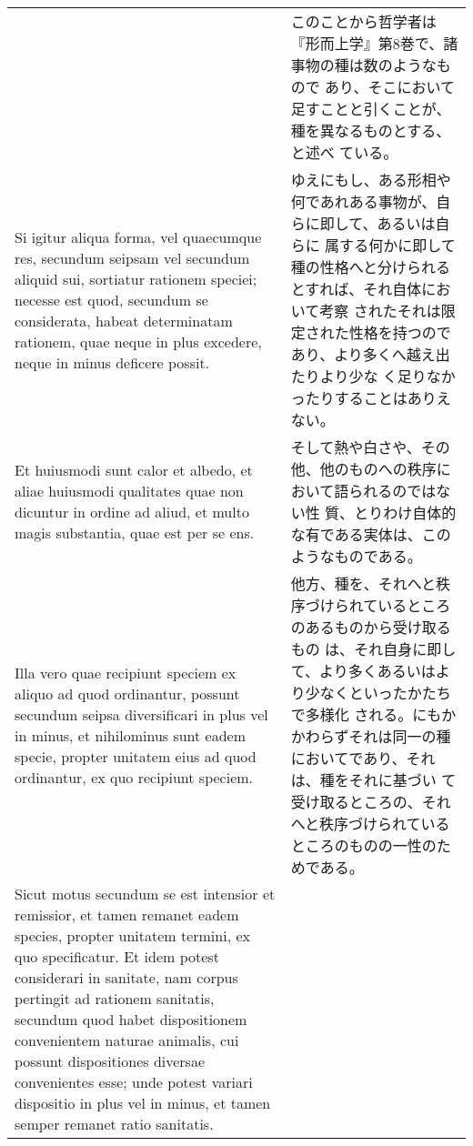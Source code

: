 \documentclass[10pt]{jsarticle} %
\begin{document}
\begin{longtable}{p{21em}p{21em}}
&

このことから哲学者は『形而上学』第8巻で、諸事物の種は数のようなもので
 あり、そこにおいて足すことと引くことが、種を異なるものとする、と述べ
 ている。

\\


Si igitur aliqua forma, vel quaecumque res,
secundum seipsam vel secundum aliquid sui, sortiatur rationem speciei;
necesse est quod, secundum se considerata, habeat determinatam
rationem, quae neque in plus excedere, neque in minus deficere
possit. 


&

ゆえにもし、ある形相や何であれある事物が、自らに即して、あるいは自らに
属する何かに即して種の性格へと分けられるとすれば、それ自体において考察
されたそれは限定された性格を持つのであり、より多くへ越え出たりより少な
く足りなかったりすることはありえない。

\\


Et huiusmodi sunt calor et albedo, et aliae huiusmodi
qualitates quae non dicuntur in ordine ad aliud, et multo magis
substantia, quae est per se ens. 


&

そして熱や白さや、その他、他のものへの秩序において語られるのではない性
質、とりわけ自体的な有である実体は、このようなものである。

\\


Illa vero quae recipiunt speciem ex
aliquo ad quod ordinantur, possunt secundum seipsa diversificari in
plus vel in minus, et nihilominus sunt eadem specie, propter unitatem
eius ad quod ordinantur, ex quo recipiunt speciem. 


&

他方、種を、それへと秩序づけられているところのあるものから受け取るもの
は、それ自身に即して、より多くあるいはより少なくといったかたちで多様化
される。にもかかわらずそれは同一の種においてであり、それは、種をそれに基づい
て受け取るところの、それへと秩序づけられているところのものの一性のた
めである。

\\


Sicut motus
secundum se est intensior et remissior, et tamen remanet eadem
species, propter unitatem termini, ex quo specificatur. Et idem potest
considerari in sanitate, nam corpus pertingit ad rationem sanitatis,
secundum quod habet dispositionem convenientem naturae animalis, cui
possunt dispositiones diversae convenientes esse; unde potest variari
dispositio in plus vel in minus, et tamen semper remanet ratio
sanitatis. 



\end{longtable}
\end{document}
